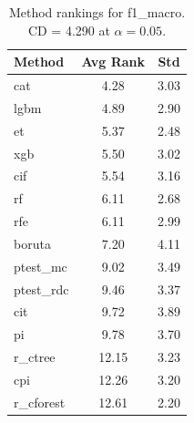 \begin{table}[h]
\centering
\caption{Method rankings for f1_macro. CD = 4.290 at $\alpha=0.05$.}
\label{tab:ranks_f1_macro}
\begin{tabular}{lcc}
\toprule
Method & Avg Rank & Std \\
\midrule
cat & 4.28 & 3.03 \\
lgbm & 4.89 & 2.90 \\
et & 5.37 & 2.48 \\
xgb & 5.50 & 3.02 \\
cif & 5.54 & 3.16 \\
rf & 6.11 & 2.68 \\
rfe & 6.11 & 2.99 \\
boruta & 7.20 & 4.11 \\
ptest_mc & 9.02 & 3.49 \\
ptest_rdc & 9.46 & 3.37 \\
cit & 9.72 & 3.89 \\
pi & 9.78 & 3.70 \\
r_ctree & 12.15 & 3.23 \\
cpi & 12.26 & 3.20 \\
r_cforest & 12.61 & 2.20 \\
\bottomrule
\end{tabular}
\end{table}